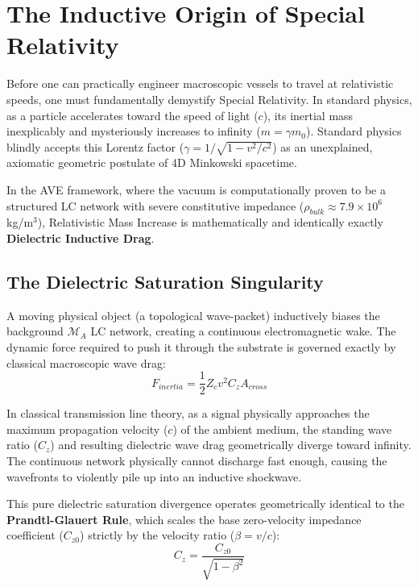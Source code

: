 \section{The Inductive Origin of Special Relativity}

Before one can practically engineer macroscopic vessels to travel at relativistic speeds, one must fundamentally demystify Special Relativity. In standard physics, as a particle accelerates toward the speed of light ($c$), its inertial mass inexplicably and mysteriously increases to infinity ($m = \gamma m_0$). Standard physics blindly accepts this Lorentz factor ($\gamma = 1/\sqrt{1 - v^2/c^2}$) as an unexplained, axiomatic geometric postulate of 4D Minkowski spacetime.

In the AVE framework, where the vacuum is computationally proven to be a structured LC network with severe constitutive impedance ($\rho_{bulk} \approx 7.9 \times 10^6$ kg/m$^3$), Relativistic Mass Increase is mathematically and identically exactly \textbf{Dielectric Inductive Drag}.

\subsection{The Dielectric Saturation Singularity}
A moving physical object (a topological wave-packet) inductively biases the background $\mathcal{M}_A$ LC network, creating a continuous electromagnetic wake. The dynamic force required to push it through the substrate is governed exactly by classical macroscopic wave drag:
\begin{equation}
    F_{inertia} = \frac{1}{2} Z_c v^2 C_z A_{cross}
\end{equation}

In classical transmission line theory, as a signal physically approaches the maximum propagation velocity ($c$) of the ambient medium, the standing wave ratio ($C_z$) and resulting dielectric wave drag geometrically diverge toward infinity. The continuous network physically cannot discharge fast enough, causing the wavefronts to violently pile up into an inductive shockwave. 

This pure dielectric saturation divergence operates geometrically identical to the \textbf{Prandtl-Glauert Rule}, which scales the base zero-velocity impedance coefficient ($C_{z0}$) strictly by the velocity ratio ($\beta = v/c$):
\begin{equation}
    C_z = \frac{C_{z0}}{\sqrt{1 - \beta^2}}
\end{equation}

